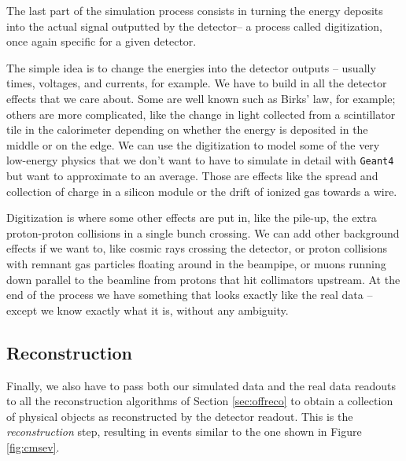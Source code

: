The last part of the simulation process consists in turning the energy deposits into the actual signal outputted by the detector-- a process called digitization, once again specific for a given detector.

The simple idea is to change the energies into the detector outputs – usually times, voltages, and currents, for example. We have to build in all the detector effects that we care about. Some are well known such as Birks’ law, for example; others are more complicated, like the change in light collected from a scintillator tile in the calorimeter depending on whether the energy is deposited in the middle or on the edge. We can use the digitization to model some of the very low-energy physics that we don’t want to have to simulate in detail with \texttt{Geant4} but want to approximate to an average. Those are effects like the spread and collection of charge in a silicon module or the drift of ionized gas towards a wire.

Digitization is where some other effects are put in, like the pile-up, the extra proton-proton collisions in a single bunch crossing. We can add other background effects if we want to, like cosmic rays crossing the detector, or proton collisions with remnant gas particles floating around in the beampipe, or muons running down parallel to the beamline from protons that hit collimators upstream. 
At the end of the process we have something that looks exactly like the real data – except we know exactly what it is, without any ambiguity.

\subsection{Reconstruction}
Finally, we also have to pass both our simulated data and the real data readouts to all the reconstruction algorithms of Section \ref{sec:offreco} to obtain a collection of physical objects as reconstructed by the detector readout. This is the \emph{reconstruction} step, resulting in events similar to the one shown in Figure \ref{fig:cmsev}.

